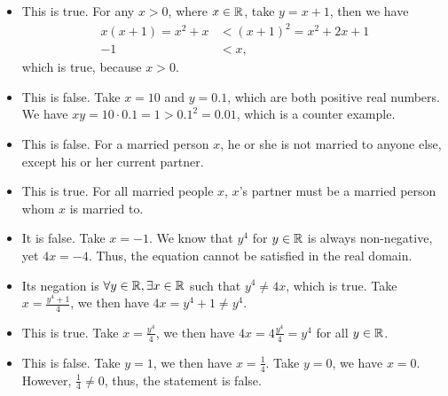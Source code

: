 \documentclass[8pt,twocolumn]{article}
\begin{document}
\begin{Answer}[number=2.3.11]
  \begin{itemize}
    \item This is true. For any $x>0$, where $x\in\mathbb{R}$, take $y=x+1$, then we
      have
      \begin{align*}
        x(x+1) = x^2 + x &< (x+1)^2 = x^2+2x+1 \\
        -1 &< x,
      \end{align*}
      which is true, because $x>0$.
    \item This is false. Take $x=10$ and $y=0.1$, which are both positive
      real numbers. We have $xy = 10\cdot 0.1 = 1 > 0.1^2 = 0.01$, which is a
      counter example.
  \end{itemize}
\end{Answer}

\begin{Answer}[number=2.3.12]
  \begin{itemize}
    \item This is false. For a married person $x$, he or she is not married to
      anyone else, except his or her current partner.
    \item This is true. For all married people $x$, $x$'s partner must be a
      married person whom $x$ is married to.
  \end{itemize}
\end{Answer}

\begin{Answer}[number=2.3.13]
  \begin{itemize}
    \item It is false. Take $x=-1$. We know that $y^4$ for $y\in \mathbb{R}$ is always non-negative,
      yet $4x = -4$. Thus, the equation cannot be satisfied in the real domain.
    \item Its negation is $\forall y\in\mathbb{R}, \exists x\in\mathbb{R}$ such that $y^4\ne
      4x$, which is true. Take $x= \frac{y^4+1}{4}$, we then have $4x=y^4+1\ne
      y^4$.
    \item This is true. Take $x=\frac{y^4}{4}$, we then have $4x=4\frac{y^4}{4}
      = y^4$ for all $y\in\mathbb{R}$.
    \item This is false. Take $y=1$, we then have $x=\frac{1}{4}$. Take $y=0$,
      we have $x=0$. However, $\frac{1}{4}\ne0$, thus, the statement is false.
  \end{itemize}
\end{Answer}
\end{document}
